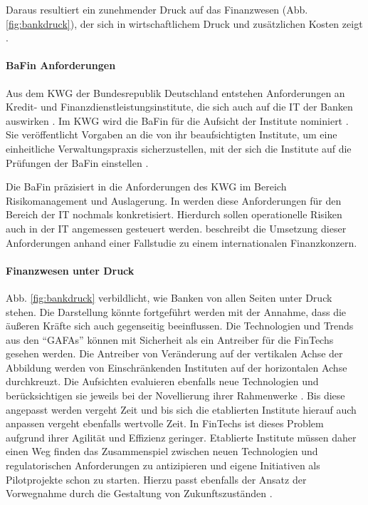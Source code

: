 Daraus resultiert ein zunehmender Druck auf das Finanzwesen (Abb. \ref{fig:bankdruck}), der sich in wirtschaftlichem Druck und zusätzlichen Kosten zeigt \cite{Smolinski2017}.

\paragraph{BaFin Anforderungen}
Aus dem \ac{KWG} der Bundesrepublik Deutschland entstehen Anforderungen \cite{MaRisk:2017} an Kredit- und Finanzdienstleistungsinstitute, die sich auch auf die IT der Banken auswirken \cite{recht/Bornemann2018}. Im \ac{KWG} wird die BaFin für die Aufsicht der Institute nominiert \cite{recht/Bornemann2018}. Sie veröffentlicht Vorgaben an die von ihr beaufsichtigten Institute, um eine einheitliche Verwaltungspraxis sicherzustellen, mit der sich die Institute auf die Prüfungen der BaFin einstellen \cite{BaFin:Verwaltungspraxis}. 

Die BaFin präzisiert in \cite{MaRisk:2017} die Anforderungen des \ac{KWG} im Bereich Risikomanagement und Auslagerung. In \cite{BAIT:2018} werden diese Anforderungen für den Bereich der IT nochmals konkretisiert. Hierdurch sollen operationelle Risiken auch in der IT angemessen gesteuert werden. \citet{mci/Knittl2013} beschreibt die Umsetzung dieser Anforderungen anhand einer Fallstudie zu einem internationalen Finanzkonzern.
\medskip
\\
\paragraph{Finanzwesen unter Druck}
Abb. \ref{fig:bankdruck} verbildlicht, wie Banken von allen Seiten unter Druck stehen. Die Darstellung könnte fortgeführt werden mit der Annahme, dass die äußeren Kräfte sich auch gegenseitig beeinflussen. Die Technologien und Trends aus den \enquote{GAFAs} können mit Sicherheit als ein Antreiber für die FinTechs gesehen werden. Die Antreiber von Veränderung auf der vertikalen Achse der Abbildung werden von Einschränkenden Instituten auf der horizontalen Achse durchkreuzt. Die Aufsichten evaluieren ebenfalls neue Technologien und berücksichtigen sie jeweils bei der Novellierung ihrer Rahmenwerke \cite{BaFin:marisk-novelle}. Bis diese angepasst werden vergeht Zeit und bis sich die etablierten Institute hierauf auch anpassen vergeht ebenfalls wertvolle Zeit. In FinTechs ist dieses Problem aufgrund ihrer Agilität und Effizienz geringer. Etablierte Institute müssen daher einen Weg finden das Zusammenspiel zwischen neuen Technologien und regulatorischen Anforderungen zu antizipieren und eigene Initiativen als Pilotprojekte schon zu starten. Hierzu passt ebenfalls der Ansatz der Vorwegnahme durch die Gestaltung von Zukunftszuständen \cite{Alt2017}.


